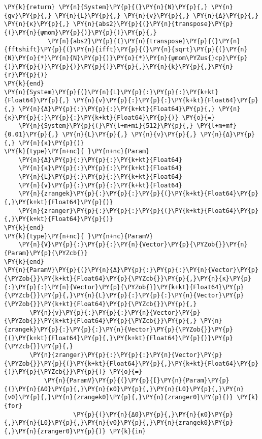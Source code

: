 \begin{Verbatim}[commandchars=\\\{\}]
    \PY{k}{return} \PY{n}{System}\PY{p}{(}\PY{n}{N}\PY{p}{,} \PY{n}{gv}\PY{p}{,} \PY{n}{L}\PY{p}{,} \PY{n}{v}\PY{p}{,} \PY{n}{Δ}\PY{p}{,} \PY{n}{κ}\PY{p}{,} \PY{n}{abs2}\PY{p}{(}\PY{n}{transpose}\PY{p}{(}\PY{n}{ψmom}\PY{p}{)}\PY{p}{)}\PY{p}{,}
            \PY{n}{abs2}\PY{p}{(}\PY{n}{transpose}\PY{p}{(}\PY{n}{fftshift}\PY{p}{(}\PY{n}{ifft}\PY{p}{(}\PY{n}{sqrt}\PY{p}{(}\PY{n}{N}\PY{o}{*}\PY{n}{N}\PY{p}{)}\PY{o}{*}\PY{n}{ψmom\PYZus{}cp}\PY{p}{)}\PY{p}{)}\PY{p}{)}\PY{p}{)}\PY{p}{,}\PY{n}{k}\PY{p}{,}\PY{n}{r}\PY{p}{)}
\PY{k}{end}
\PY{n}{System}\PY{p}{(}\PY{n}{L}\PY{p}{:}\PY{p}{:}\PY{k+kt}{Float64}\PY{p}{,} \PY{n}{v}\PY{p}{:}\PY{p}{:}\PY{k+kt}{Float64}\PY{p}{,} \PY{n}{Δ}\PY{p}{:}\PY{p}{:}\PY{k+kt}{Float64}\PY{p}{,} \PY{n}{κ}\PY{p}{:}\PY{p}{:}\PY{k+kt}{Float64}\PY{p}{)} \PY{o}{=}
    \PY{n}{System}\PY{p}{(}\PY{l+m+mi}{512}\PY{p}{,} \PY{l+m+mf}{0.01}\PY{p}{,} \PY{n}{L}\PY{p}{,} \PY{n}{v}\PY{p}{,} \PY{n}{Δ}\PY{p}{,} \PY{n}{κ}\PY{p}{)}
\PY{k}{type}\PY{n+nc}{ }\PY{n+nc}{Param}
    \PY{n}{Δ}\PY{p}{:}\PY{p}{:}\PY{k+kt}{Float64}
    \PY{n}{κ}\PY{p}{:}\PY{p}{:}\PY{k+kt}{Float64}
    \PY{n}{L}\PY{p}{:}\PY{p}{:}\PY{k+kt}{Float64}
    \PY{n}{v}\PY{p}{:}\PY{p}{:}\PY{k+kt}{Float64}
    \PY{n}{zrangek}\PY{p}{:}\PY{p}{:}\PY{p}{(}\PY{k+kt}{Float64}\PY{p}{,}\PY{k+kt}{Float64}\PY{p}{)}
    \PY{n}{zranger}\PY{p}{:}\PY{p}{:}\PY{p}{(}\PY{k+kt}{Float64}\PY{p}{,}\PY{k+kt}{Float64}\PY{p}{)}
\PY{k}{end}
\PY{k}{type}\PY{n+nc}{ }\PY{n+nc}{ParamV}
    \PY{n}{V}\PY{p}{:}\PY{p}{:}\PY{n}{Vector}\PY{p}{\PYZob{}}\PY{n}{Param}\PY{p}{\PYZcb{}}
\PY{k}{end}
\PY{n}{ParamV}\PY{p}{(}\PY{n}{Δ}\PY{p}{:}\PY{p}{:}\PY{n}{Vector}\PY{p}{\PYZob{}}\PY{k+kt}{Float64}\PY{p}{\PYZcb{}}\PY{p}{,}\PY{n}{κ}\PY{p}{:}\PY{p}{:}\PY{n}{Vector}\PY{p}{\PYZob{}}\PY{k+kt}{Float64}\PY{p}{\PYZcb{}}\PY{p}{,}\PY{n}{L}\PY{p}{:}\PY{p}{:}\PY{n}{Vector}\PY{p}{\PYZob{}}\PY{k+kt}{Float64}\PY{p}{\PYZcb{}}\PY{p}{,}
       \PY{n}{v}\PY{p}{:}\PY{p}{:}\PY{n}{Vector}\PY{p}{\PYZob{}}\PY{k+kt}{Float64}\PY{p}{\PYZcb{}}\PY{p}{,} \PY{n}{zrangek}\PY{p}{:}\PY{p}{:}\PY{n}{Vector}\PY{p}{\PYZob{}}\PY{p}{(}\PY{k+kt}{Float64}\PY{p}{,}\PY{k+kt}{Float64}\PY{p}{)}\PY{p}{\PYZcb{}}\PY{p}{,}
       \PY{n}{zranger}\PY{p}{:}\PY{p}{:}\PY{n}{Vector}\PY{p}{\PYZob{}}\PY{p}{(}\PY{k+kt}{Float64}\PY{p}{,}\PY{k+kt}{Float64}\PY{p}{)}\PY{p}{\PYZcb{}}\PY{p}{)} \PY{o}{=}
           \PY{n}{ParamV}\PY{p}{(}\PY{p}{[}\PY{n}{Param}\PY{p}{(}\PY{n}{Δ0}\PY{p}{,}\PY{n}{κ0}\PY{p}{,}\PY{n}{L0}\PY{p}{,}\PY{n}{v0}\PY{p}{,}\PY{n}{zrangek0}\PY{p}{,}\PY{n}{zranger0}\PY{p}{)} \PY{k}{for}
                   \PY{p}{(}\PY{n}{Δ0}\PY{p}{,}\PY{n}{κ0}\PY{p}{,}\PY{n}{L0}\PY{p}{,}\PY{n}{v0}\PY{p}{,}\PY{n}{zrangek0}\PY{p}{,}\PY{n}{zranger0}\PY{p}{)} \PY{k}{in}

\end{Verbatim}
